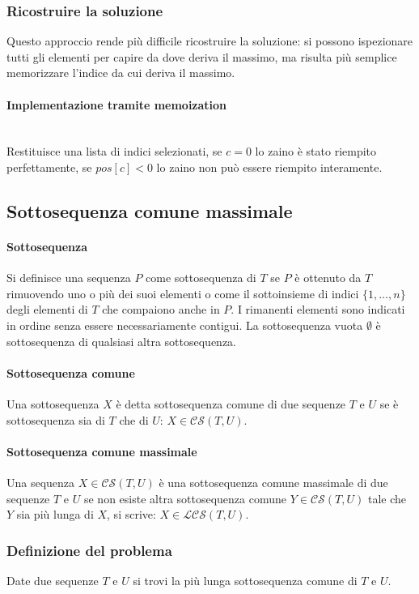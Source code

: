 		\subsubsection{Ricostruire la soluzione}
			Questo approccio rende pi\`u difficile ricostruire la soluzione: si possono ispezionare tutti gli elementi per capire da dove deriva il massimo, ma 
			risulta pi\`u semplice memorizzare l'indice da cui deriva il massimo. 
			\paragraph{Implementazione tramite memoization}\mbox{}\\
			
			Restituisce una lista di indici selezionati, se $c=0$ lo zaino \`e stato riempito perfettamente, se $pos[c]<0$ lo zaino non pu\`o essere riempito 
			interamente.
		\subsection{Sottosequenza comune massimale}
			\paragraph{Sottosequenza}
			Si definisce una sequenza $P$ come sottosequenza di $T$ se $P$ \`e ottenuto da $T$ rimuovendo uno o pi\`u dei suoi elementi o come il sottoinsieme di indici
			$\{1, \dots, n\}$ degli elementi di $T$ che compaiono anche in $P$. I rimanenti elementi sono indicati in ordine senza essere necessariamente contigui. La
			sottosequenza vuota $\emptyset$ \`e sottosequenza di qualsiasi altra sottosequenza. 
			\paragraph{Sottosequenza comune}
			Una sottosequenza $X$ \`e detta sottosequenza comune di due sequenze $T$ e $U$ se \`e sottosequenza sia di $T$ che di $U$: $X\in \mathcal{CS}(T, U)$.
			\paragraph{Sottosequenza comune massimale}
			Una sequenza $X\in \mathcal{CS}(T, U)$ \`e una sottosequenza comune massimale di due sequenze $T$ e $U$ se non esiste altra sottosequenza comune $Y\in 
			\mathcal{CS}(T, U)$ tale che $Y$ sia pi\`u lunga di $X$, si scrive: $X\in \mathcal{LCS}(T, U)$.
		\subsubsection{Definizione del problema}
			Date due sequenze $T$ e $U$ si trovi la pi\`u lunga sottosequenza comune di $T$ e $U$. 
